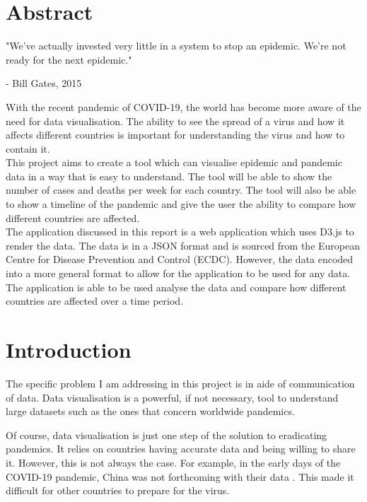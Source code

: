 \documentclass{report}
\begin{document}
\chapter{Abstract}
\begin{center}
    \LARGE{"We've actually invested very little in a system to stop an epidemic. We're not ready for the next epidemic."}
\end{center}
\begin{flushright}
    \large{- Bill Gates, 2015 \cite{gates:2015}}
\end{flushright}
With the recent pandemic of COVID-19, the world has become more aware of the need for data visualisation. The ability to see the spread of a virus and how it affects different countries is important for understanding the virus and how to contain it.\\
This project aims to create a tool which can visualise epidemic and pandemic data in a way that is easy to understand. The tool will be able to show the number of cases and deaths per week for each country. The tool will also be able to show a timeline of the pandemic and give the user the ability to compare how different countries are affected.\\
The application discussed in this report is a web application which uses D3.js to render the data. The data is in a JSON format and is sourced from the European Centre for Disease Prevention and Control (ECDC). However, the data encoded into a more general format to allow for the application to be used for any data.\\
The application is able to be used analyse the data and compare how different countries are affected over a time period.

\newpage
\chapter{Introduction}
The specific problem I am addressing in this project is in aide of communication of data. Data visualisation is a powerful, if not necessary, tool to understand large datasets such as the ones that concern worldwide pandemics.

Of course, data visualisation is just one step of the solution to eradicating pandemics. It relies on countries having accurate data and being willing to share it. However, this is not always the case. For example, in the early days of the COVID-19 pandemic, China was not forthcoming with their data \cite{chinawrongdata:2019}. This made it difficult for other countries to prepare for the virus.
\end{document}
